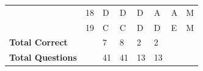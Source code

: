 \documentclass[pageno]{jpaper}
\begin{document}
\begin{table}[]
\begin{tabular}{llllllll}
\textbf{}                & 18              & D                       & D                      & D                       & A                       & A                       & M                   \\
\textbf{}                & 19              & C                       & C                      & D                       & D                       & E                       & M                   \\ \midrule
\textbf{Total Correct}   &                 & 7                       & 8                      & 2                       & 2                       &                         &                     \\
\textbf{Total Questions} &                 & 41                      & 41                     & 13                      & 13                      &                         &                     \\ \bottomrule
\end{tabular}
\end{table}
\end{document}

